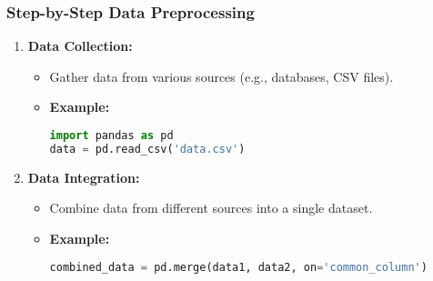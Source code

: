 \documentclass[aspectratio=169]{beamer}
\begin{document}
\begin{frame}[fragile]
    \frametitle{Step-by-Step Data Preprocessing}
    \begin{enumerate}
        \item \textbf{Data Collection:}
        \begin{itemize}
            \item Gather data from various sources (e.g., databases, CSV files).
            \item \textbf{Example:}
            \begin{lstlisting}[language=Python]
import pandas as pd
data = pd.read_csv('data.csv')
            \end{lstlisting}
        \end{itemize}
        
        \item \textbf{Data Integration:}
        \begin{itemize}
            \item Combine data from different sources into a single dataset.
            \item \textbf{Example:}
            \begin{lstlisting}[language=Python]
combined_data = pd.merge(data1, data2, on='common_column')
            \end{lstlisting}
        \end{itemize}
    \end{enumerate}
\end{frame}
\end{document}
